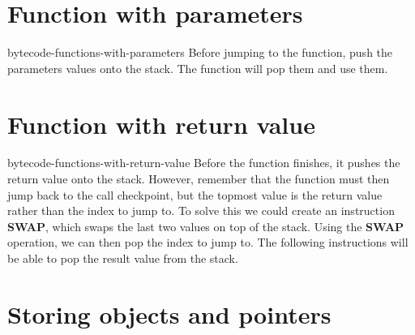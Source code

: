 \documentclass[preview]{standalone}
\begin{document}
\section{Function with parameters}

\begin{snippet}{bytecode-functions-with-parameters}
    Before jumping to the function, push the parameters values onto the stack.
    The function will pop them and use them.
\end{snippet}

\section{Function with return value}

\begin{snippet}{bytecode-functions-with-return-value}
    Before the function finishes, it pushes the return value onto the stack.
    However, remember that the function must then jump back to the call checkpoint,
    but the topmost value is the return value rather than the index to jump to.
    To solve this we could create an instruction \textbf{SWAP}, which swaps the last two values on top of the stack.
    Using the \textbf{SWAP} operation, we can then pop the index to jump to. The following instructions will be able to pop
    the result value from the stack.
\end{snippet}

\section{Storing objects and pointers}
\end{document}
